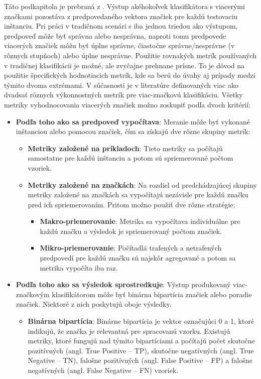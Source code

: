 Táto podkapitola je prebraná z \cite{Herrera:2016}. Výstup akéhokoľvek klasifikátora s viacerými značkami pozostáva z predpovedaného vektora značiek pre každú testovaciu inštanciu. Pri práci v tradičnom scenári s iba jednou triedou ako výstupom,  predpoveď môže byť správna alebo nesprávna, naproti tomu predpovede viacerých značiek môžu byť úplne správne, čiastočne správne/nesprávne (v rôznych stupňoch) alebo úplne nesprávne.
Použitie rovnakých metrík používaných v tradičnej klasifikácii je možné, ale zvyčajne prehnane prísne. To je dôvod na použitie špecifických hodnotiacich metrík, kde sa berú do úvahy aj prípady medzi týmito dvoma extrémami.
V súčasnosti je v literatúre definovaných viac ako dvadsať rôznych výkonnostných metrík pre viac-značkovú klasifikáciu. Všetky metriky vyhodnocovania viacerých značiek možno zoskupiť podľa dvoch kritérií:
\begin{itemize}
\item \textbf{Podľa toho ako sa  predpoveď vypočítava}: Meranie môže byť vykonané inštanciou alebo pomocou
značiek, čím sa získajú dve rôzne skupiny metrík:
    \begin{itemize}
    \item \textbf{Metriky založené na príkladoch}: Tieto metriky sa počítajú samostatne pre každú inštanciu a potom sú  spriemerované počtom vzoriek.
    \item \textbf{Metriky založené na značkách}: Na rozdiel od predchádzajúcej skupiny metriky založené na značkách sa vypočítajú nezávisle pre každú značku pred ich spriemerovaním. Pritom možno použiť dve rôzne stratégie:
        \begin{itemize}
        \item \textbf{Makro-priemerovanie}: Metrika sa vypočítava individuálne pre každú značku a
        výsledok je spriemerovaný počtom značiek.
        \item \textbf{Mikro-priemerovanie}: Počítadlá trafených a netrafených predpovedí pre každú značku sú najskôr agregované a potom sa metrika vypočíta iba raz.
        \end{itemize}
    \end{itemize}
\item \textbf{Podľa toho ako sa výsledok sprostredkuje}: Výstup produkovaný viac-značkovým klasifikátorom môže byť binárna bipartícia značiek alebo poradie značiek. Niektoré z nich poskytujú oboje výsledky.
    \begin{itemize}
    \item \textbf{Binárna bipartícia}: Binárne bipartícia je vektor označujúci 0 a 1, ktoré indikujú, že značka je relevantná pre spracovanú vzorku. Existujú metriky, ktoré fungujú nad týmito bipartíciami a počítajú počet skutočne pozitívných (angl. True Positive -- TP), skutočne negatívných (angl. True Negative -- TN), falošne pozitívných (angl. False Positive -- FP) a falošne negatívných (angl. False Negative -- FN) vzoriek.

\end{itemize}
\end{itemize}
